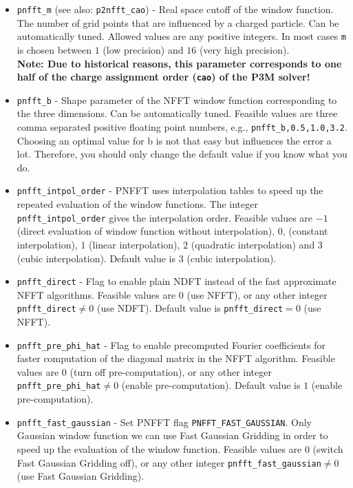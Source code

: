 \begin{itemize}
  \item \verb!pnfft_m! (see also: \verb!p2nfft_cao!) -
    Real space cutoff of the window function. The number of grid points that are influenced
    by a charged particle. Can be automatically tuned. Allowed values are any positive integers.
    In most cases \verb!m! is chosen between $1$ (low precision) and $16$ (very high precision).\\
    {\bfseries Note: Due to historical reasons, this parameter corresponds to one half of the charge assignment order
    (\verb!cao!) of the P3M solver!}
  \item \verb!pnfft_b! -
    Shape parameter of the NFFT window function corresponding to the three dimensions. Can be automatically tuned.
    Feasible values are three comma separated positive floating point numbers, e.g., \verb!pnfft_b,0.5,1.0,3.2!.
    Choosing an optimal value for b is not that easy but influences the error a lot.
    Therefore, you should only change the default value if you know what you do.
  \item \verb!pnfft_intpol_order! -
    PNFFT uses interpolation tables to speed up the repeated evaluation of the window functions. The integer \verb!pnfft_intpol_order! gives the interpolation order.
    Feasible values are $-1$ (direct evaluation of window function without interpolation), $0$, (constant interpolation), $1$ (linear interpolation), $2$ (quadratic interpolation) and $3$ (cubic interpolation).
    Default value is $3$ (cubic interpolation).
  \item \verb!pnfft_direct! -
    Flag to enable plain NDFT instead of the fast approximate NFFT algorithms. 
    Feasible values are $0$ (use NFFT), or any other integer \verb!pnfft_direct!$\ne0$ (use NDFT). Default value is \verb!pnfft_direct!$=0$ (use NFFT).
  \item \verb!pnfft_pre_phi_hat! -
    Flag to enable precomputed Fourier coefficients for faster computation of the diagonal matrix in the NFFT algorithm.
    Feasible values are $0$ (turn off pre-computation), or any other integer \verb!pnfft_pre_phi_hat!$\ne0$ (enable pre-computation).
    Default value is $1$ (enable pre-computation).
  \item \verb!pnfft_fast_gaussian! -
    Set PNFFT flag \verb!PNFFT_FAST_GAUSSIAN!. Only Gaussian window function we can use Fast Gaussian Gridding in order to speed up the evaluation of the window function.
    Feasible values are $0$ (switch Fast Gaussian Gridding off), or any other integer \verb!pnfft_fast_gaussian!$\ne0$ (use Fast Gaussian Gridding).

\end{itemize}

